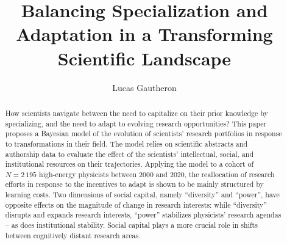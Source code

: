 \documentclass{article}
\title{Balancing Specialization and Adaptation in a Transforming Scientific Landscape}
\author{Lucas Gautheron\protect\affmark[1,2]}
\date{}
\begin{document}
\maketitle




\begin{abstract}
    How scientists navigate between the need to capitalize on their prior knowledge by specializing, and the need to adapt to evolving research opportunities? This paper proposes a Bayesian model of the evolution of scientists' research portfolios in response to transformations in their field. The model relies on scientific abstracts and authorship data to evaluate the effect of the scientists' intellectual, social, and institutional resources on their trajectories. Applying the model to a cohort of $N=2\,195$ high-energy physicists between 2000 and 2020, 
    the reallocation of research efforts in response to the incentives to adapt is shown to be mainly structured by learning costs. Two dimensions of social capital, namely ``diversity'' and ``power'', have opposite effects on the magnitude of change in research interests: while ``diversity'' disrupts and expands research interests, ``power'' stabilizes physicists' research agendas -- as does institutional stability. Social capital plays a more crucial role in shifts between cognitively distant research areas.
\end{abstract}
\end{document}
